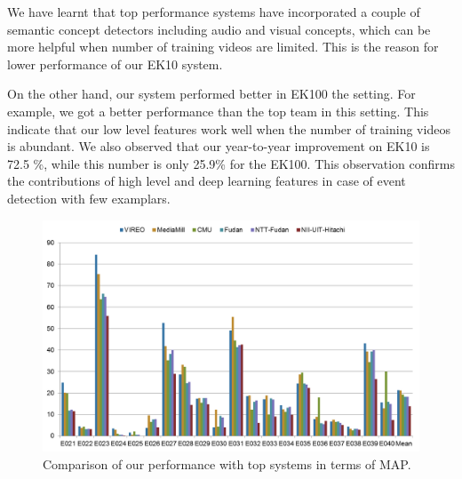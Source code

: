 We have learnt that top performance systems have incorporated a couple of semantic concept detectors including audio and visual concepts, which can be more helpful when number of training videos are limited. This is the reason for lower performance of our EK10 system.

On the other hand, our system performed better in EK100 the setting. For example, we got a better performance than the top team in this setting. This indicate that our low level features work well when the number of training videos is abundant. We also observed that our year-to-year improvement on EK10 is 72.5 \%, while this number is only 25.9\% for the EK100. This observation confirms the contributions of high level and deep learning features in case of event detection with few examplars.

\begin{figure}
	\centering
	\includegraphics[width=1\textwidth]{result_team.png}
	\caption{Comparison of our performance with top systems in terms of MAP.}
	\label{result_team}
\end{figure}



